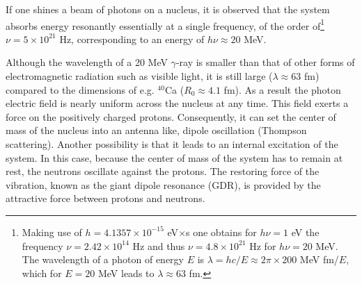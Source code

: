 If one shines a beam of photons on a nucleus, it is observed that the system 
absorbs energy resonantly essentially at a single frequency, of the order of\footnote{Making use of $h=4.1357\times10^{-15}$ eV$\times$s one obtains for $h\nu=1$ eV the frequency $\nu=2.42\times10^{14}$ Hz and thus $\nu=4.8\times10^{21}$ Hz for $h\nu=20$ MeV. The wavelength of a photon of energy $E$ is $\lambda=hc/E\approx2\pi\times200$ MeV fm/$E$, which for $E=20$ MeV leads to $\lambda\approx63$ fm.} $\nu=5\times10^{21}$ Hz, corresponding to an energy of $h\nu\approx20$ MeV.


Although the wavelength of a 20 MeV $\gamma$-ray is smaller than that of other forms of electromagnetic radiation such as visible light, it is still large ($\lambda\approx63$ fm) compared to the dimensions of e.g. $^{40}$Ca ($R_0\approx4.1$ fm). As a result the photon electric field is nearly uniform across the nucleus at any time. This field exerts a force on the positively charged protons. Consequently, it can set the center of mass of the nucleus into an antenna like, dipole oscillation (Thompson scattering). Another possibility is that it leads to an internal excitation of the system. In this case, because the center of mass of the system has to remain at rest, the neutrons oscillate against the protons. The restoring force of the vibration, known as the giant dipole resonance (GDR), is provided by the attractive force between protons and neutrons.




